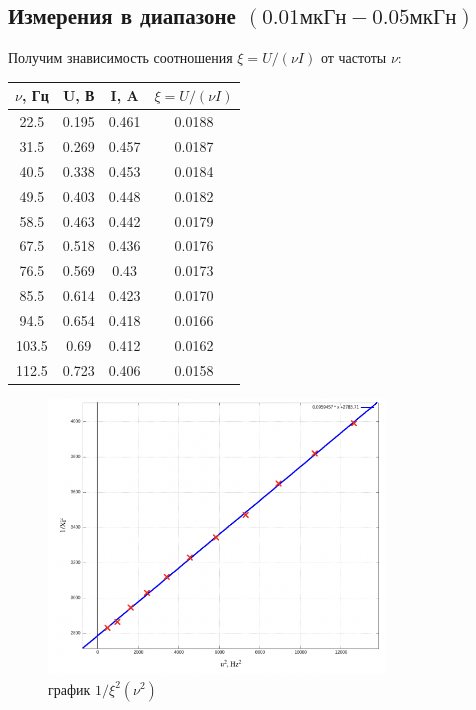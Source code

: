 \documentclass[11pt]{article}
\begin{document}
\subsection{Измерения в диапазоне \((0.01мкГн - 0.05мкГн)\)}
Получим знависимость соотношения \( \xi = U/(\nu I) \) от частоты \(\nu\):
\begin{table}[H]
    \centering
    \begin{tabular}{|c|c|c|c|}
    \hline
    \(\nu\), Гц & U, В  & I, A  & \(\xi = U/(\nu I)\) \\\hline
    22.5 & 0.195 & 0.461 & 0.0188   \\\hline
    31.5 & 0.269 & 0.457 & 0.0187   \\\hline
    40.5 & 0.338 & 0.453 & 0.0184   \\\hline
    49.5 & 0.403 & 0.448 & 0.0182   \\\hline
    58.5 & 0.463 & 0.442 & 0.0179   \\\hline
    67.5 & 0.518 & 0.436 & 0.0176   \\\hline
    76.5 & 0.569 & 0.43  & 0.0173   \\\hline
    85.5 & 0.614 & 0.423 & 0.0170   \\\hline
    94.5 & 0.654 & 0.418 & 0.0166   \\\hline
    103.5& 0.69  & 0.412 & 0.0162   \\\hline
    112.5& 0.723 & 0.406 & 0.0158   \\\hline
    \end{tabular}
\end{table}

\begin{figure}[H]
    \centering
    \includegraphics[width=0.8\textwidth]{1.png}
    \caption{график \( 1/\xi^2(\nu^2) \)}
    \label{plot1}
\end{figure}
\end{document}
